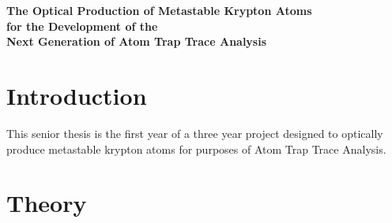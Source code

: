 \documentclass[prb,preprint]{revtex4-1}
\begin{document}
\begin{titlepage}
\thispagestyle{empty}
\begin{center}

\fontsize{20pt}{20pt}\text{   }
\vspace{30mm}

{\fontsize{18pt}{18pt}\selectfont \textbf{The Optical Production of Metastable Krypton Atoms \\ for the Development of the \\ Next Generation of Atom Trap Trace Analysis}}


\vfill
{\fontsize{14pt}{14pt}\selectfont {}}

\vfill




\vfill
{\fontsize{14pt}{14pt} \selectfont {}}


\vfill
{}
\vfill

\end{center}
\end{titlepage}


\section{Introduction} 
This senior thesis is the first year of a three year project designed to optically produce metastable krypton atoms for purposes of Atom Trap Trace Analysis.

\section{Theory}
\end{document}
